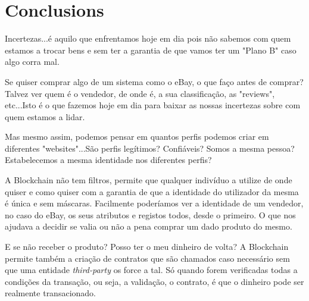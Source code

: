 \documentclass{llncs}
\begin{document}

\section{Conclusions}

	Incertezas...é aquilo que enfrentamos hoje em dia pois não sabemos com quem estamos a trocar bens e sem ter a garantia de que vamos ter um "Plano B" caso algo corra mal.

    \vspace{0.05cm}

	Se quiser comprar algo de um sistema como o eBay, o que faço antes de comprar? Talvez ver quem é o vendedor, de onde é, a sua classificação, as "reviews", etc...Isto é o que fazemos hoje em dia para baixar as nossas incertezas sobre com quem estamos a lidar.

	    \vspace{0.05cm}

Mas mesmo assim, podemos pensar em quantos perfis podemos criar em diferentes "websites"...São perfis legítimos? Confiáveis? Somos a mesma pessoa? Estabelecemos a mesma identidade nos diferentes perfis?

    \vspace{0.05cm}

	A Blockchain não tem filtros, permite que qualquer indivíduo a utilize de onde quiser e como quiser com a garantia de que a identidade do utilizador da mesma é única e sem máscaras. Facilmente poderíamos ver a identidade de um vendedor, no caso do eBay, os seus atributos e registos todos, desde o primeiro. O que nos ajudava a decidir se valia ou não a pena comprar um dado produto do mesmo.

	    \vspace{0.05cm}

E se não receber o produto? Posso ter o meu dinheiro de volta? A Blockchain permite também a criação de contratos que são chamados caso necessário sem que uma entidade \textit{third-party} os force a tal. Só quando forem verificadas todas a condições da transação, ou seja, a validação, o contrato, é que o dinheiro pode ser realmente transacionado.

    \vspace{0.05cm}
\end{document}

